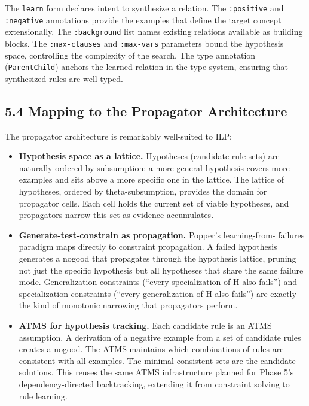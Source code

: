 \documentclass[11pt]{article}
\begin{document}
The \texttt{learn} form declares intent to synthesize a relation. The
\texttt{:positive} and \texttt{:negative} annotations provide the examples that
define the target concept extensionally. The \texttt{:background} list names
existing relations available as building blocks. The \texttt{:max-clauses}
and \texttt{:max-vars} parameters bound the hypothesis space, controlling the
complexity of the search. The type annotation (\texttt{ParentChild}) anchors
the learned relation in the type system, ensuring that synthesized
rules are well-typed.
\subsection{5.4 Mapping to the Propagator Architecture}
\label{sec:org736ce1b}

The propagator architecture is remarkably well-suited to ILP:

\begin{itemize}
\item \textbf{Hypothesis space as a lattice.} Hypotheses (candidate rule sets)
are naturally ordered by subsumption: a more general hypothesis
covers more examples and sits above a more specific one in the
lattice. The lattice of hypotheses, ordered by theta-subsumption,
provides the domain for propagator cells. Each cell holds the
current set of viable hypotheses, and propagators narrow this set as
evidence accumulates.

\item \textbf{Generate-test-constrain as propagation.} Popper's learning-from-
failures paradigm maps directly to constraint propagation. A failed
hypothesis generates a nogood that propagates through the hypothesis
lattice, pruning not just the specific hypothesis but all hypotheses
that share the same failure mode. Generalization constraints
(``every specialization of H also fails'') and specialization
constraints (``every generalization of H also fails'') are exactly
the kind of monotonic narrowing that propagators perform.

\item \textbf{ATMS for hypothesis tracking.} Each candidate rule is an ATMS
assumption. A derivation of a negative example from a set of
candidate rules creates a nogood. The ATMS maintains which
combinations of rules are consistent with all examples. The minimal
consistent sets are the candidate solutions. This reuses the same
ATMS infrastructure planned for Phase 5's dependency-directed
backtracking, extending it from constraint solving to rule learning.
\end{itemize}
\end{document}

